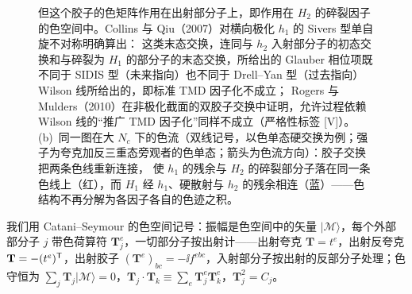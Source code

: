 \begin{figure}[htbp]
{但这个胶子的色矩阵作用在出射部分子上，即作用在 $H_2$ 的碎裂因子的色空间中。Collins 与 Qiu（2007）对横向极化 $h_1$ 的 Sivers 型单自旋不对称明确算出：
这类末态交换，连同与 $h_2$ 入射部分子的初态交换和与碎裂为 $H_1$ 的部分子的末态交换，所给出的 Glauber 相位项既不同于 SIDIS 型（未来指向）也不同于 Drell--Yan 型（过去指向）Wilson 线所给出的，即标准 TMD 因子化不成立；
Rogers 与 Mulders（2010）在非极化截面的双胶子交换中证明，允许过程依赖 Wilson 线的“推广 TMD 因子化”同样不成立（严格性标签 [V]）。
(b)~同一图在大 $N_c$ 下的色流（双线记号，以色单态硬交换为例；强子为夸克加反三重态旁观者的色单态；箭头为色流方向）：胶子交换把两条色线重新连接，
使 $h_1$ 的残余与 $H_2$ 的碎裂部分子落在同一条色线上（红），而 $H_1$ 经 $h_1$、硬散射与 $h_2$ 的残余相连（蓝）——色结构不再分解为各因子各自的色迹之积。}
\label{fig:violation-cq}
\end{figure}

我们用 Catani--Seymour 的色空间记号\cite{CataniSeymour1997}：振幅是色空间中的矢量 $|\mathcal M\rangle$，每个外部部分子 $j$ 带色荷算符 $\mathbf T_j^e$，一切部分子按出射计——出射夸克 $\mathbf T=t^e$，出射反夸克 $\mathbf T=-(t^e)^{\mathsf{T}}$，出射胶子 $(\mathbf T^e)_{bc}=-\ii f^{ebc}$，入射部分子按出射的反部分子处理；色守恒为 $\sum_j\mathbf T_j|\mathcal M\rangle=0$，$\mathbf T_j\cdot\mathbf T_k\equiv\sum_e\mathbf T_j^e\mathbf T_k^e$，$\mathbf T_j^2=C_j$。

